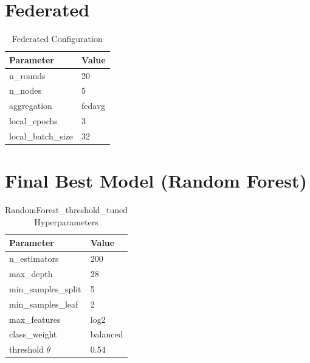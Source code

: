 \section{Federated}

\begin{table}[h]
\centering
\caption{Federated Configuration}
\begin{tabular}{ll}
\toprule
Parameter & Value \\
\midrule
n\_rounds & 20 \\
n\_nodes & 5 \\
aggregation & fedavg \\
local\_epochs & 3 \\
local\_batch\_size & 32 \\
\bottomrule
\end{tabular}
\end{table}

\section{Final Best Model (Random Forest)}

\begin{table}[h]
\centering
\caption{RandomForest\_threshold\_tuned Hyperparameters}
\begin{tabular}{ll}
\toprule
Parameter & Value \\
\midrule
n\_estimators & 200 \\
max\_depth & 28 \\
min\_samples\_split & 5 \\
min\_samples\_leaf & 2 \\
max\_features & log2 \\
class\_weight & balanced \\
threshold $\theta$ & 0.54 \\
\bottomrule
\end{tabular}
\end{table}
